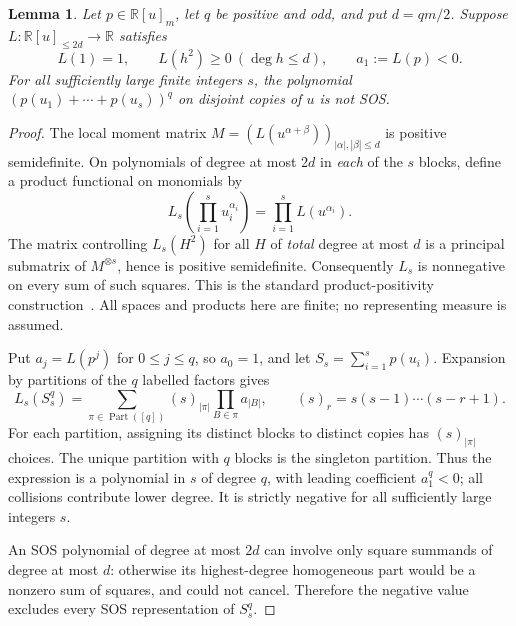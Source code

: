 \documentclass[11pt]{article}
\newtheorem{lemma}{Lemma}
\newcommand{\R}{\mathbb R}
\begin{document}
\begin{lemma}\label{lem:product}
Let $p\in\R[u]_m$, let $q$ be positive and odd, and put $d=qm/2$.
Suppose $L:\R[u]_{\le2d}\to\R$ satisfies
\[
 L(1)=1,\qquad L(h^2)\ge0\ (\deg h\le d),\qquad a_1:=L(p)<0.
\]
For all sufficiently large finite integers $s$, the polynomial
$(p(u_1)+\cdots+p(u_s))^q$ on disjoint copies of $u$ is not SOS.
\end{lemma}
\begin{proof}
The local moment matrix
$M=(L(u^{\alpha+\beta}))_{|\alpha|,|\beta|\le d}$ is positive semidefinite.
On polynomials of degree at most $2d$ in \emph{each} of the $s$ blocks,
define a product functional on monomials by
\[
 L_s\!\left(\prod_{i=1}^s u_i^{\alpha_i}\right)
                  =\prod_{i=1}^s L(u^{\alpha_i}).
\]
The matrix controlling $L_s(H^2)$ for all $H$ of \emph{total} degree at
most $d$ is a principal submatrix of $M^{\otimes s}$, hence is positive
semidefinite. Consequently $L_s$ is nonnegative on every sum of such
squares. This is the standard product-positivity construction~\cite{BKS}.
All spaces and products here are finite; no representing measure is assumed.

Put $a_j=L(p^j)$ for $0\le j\le q$, so $a_0=1$, and let
$S_s=\sum_{i=1}^s p(u_i)$. Expansion by partitions of the $q$ labelled
factors gives
\begin{equation}\label{eq:partitions}
 L_s(S_s^q)=\sum_{\pi\in\operatorname{Part}([q])}
              (s)_{|\pi|}\prod_{B\in\pi}a_{|B|},
 \qquad (s)_r=s(s-1)\cdots(s-r+1).
\end{equation}
For each partition, assigning its distinct blocks to distinct copies
has $(s)_{|\pi|}$ choices. The unique partition with $q$ blocks is the
singleton partition. Thus the expression is a polynomial in $s$ of degree
$q$, with leading coefficient $a_1^q<0$; all collisions contribute lower
degree. It is strictly negative for all sufficiently large integers $s$.

An SOS polynomial of degree at most $2d$ can involve only square summands
of degree at most $d$: otherwise its highest-degree homogeneous part
would be a nonzero sum of squares, and could not cancel. Therefore the
negative value excludes every SOS representation of $S_s^q$.
\end{proof}
\end{document}
